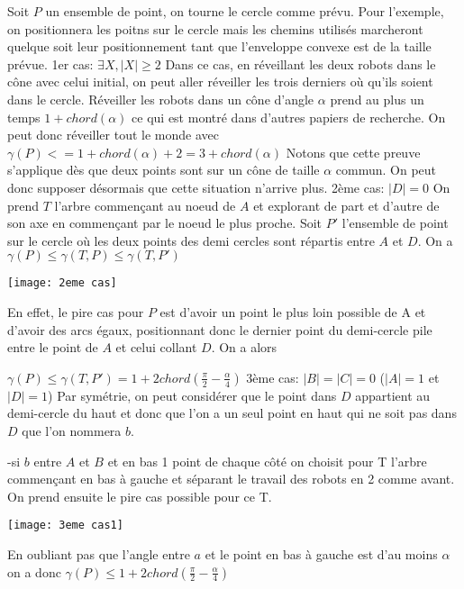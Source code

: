 Soit $P$ un ensemble de point, on tourne le cercle comme prévu. Pour l'exemple, on positionnera les poitns sur le cercle mais les chemins utilisés marcheront quelque soit leur positionnement tant que l'enveloppe convexe est de la taille prévue.
\newline
\newline
1er cas: $\exists X, |X| \geq 2$
Dans ce cas, en réveillant les deux robots dans le cône avec celui initial, on peut aller réveiller les trois derniers où qu'ils soient dans le cercle. Réveiller les robots dans un cône d'angle $\alpha$ prend au plus un temps $1 + chord(\alpha)$ ce qui est montré dans d'autres papiers de recherche.
On peut donc réveiller tout le monde avec $\gamma(P) <= 1 + chord(\alpha) + 2 = 3 + chord(\alpha)$
Notons que cette preuve s'applique dès que deux points sont sur un cône de taille $\alpha$ commun. On peut donc supposer désormais que cette situation n'arrive plus.
\newline
\newline
2ème cas: $|D| = 0$
On prend $T$ l'arbre commençant au noeud de $A$ et explorant de part et d'autre de son axe en commençant par le noeud le plus proche.
Soit $P'$ l'ensemble de point sur le cercle où les deux points des demi cercles sont répartis entre $A$ et $D$.
On a $\gamma(P) \leq  \gamma(T, P) \leq \gamma(T, P')$

\texttt{[image: 2eme cas]}

En effet, le pire cas pour $P$ est d'avoir un point le plus loin possible de A et d'avoir des arcs égaux, positionnant donc le dernier point du demi-cercle pile entre le point de $A$ et celui collant $D$. On a alors

$\gamma(P) \leq \gamma(T, P') = 1 + 2chord(\frac{\pi}{2} - \frac{\alpha}{4})$
\newline
\newline
3ème cas: $|B| = |C| = 0$ ($|A| = 1$ et $|D| = 1$)
Par symétrie, on peut considérer que le point dans $D$ appartient au demi-cercle du haut et donc que l'on a un seul point en haut qui ne soit pas dans $D$ que l'on nommera $b$.

-si $b$ entre $A$ et $B$ et en bas 1 point de chaque côté
on choisit pour T l'arbre commençant en bas à gauche et séparant le travail des robots en 2 comme avant.
On prend ensuite le pire cas possible pour ce T.

\texttt{[image: 3eme cas1]}

En oubliant pas que l'angle entre $a$ et le point en bas à gauche est d'au moins $\alpha$ on a donc 
$\gamma(P) \leq 1 + 2chord(\frac{\pi}{2} - \frac{\alpha}{4})$

